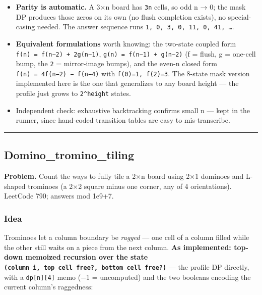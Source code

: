 \documentclass[
  10pt,
  letterpaper,
  onecolumn]{article}
\providecommand{\tightlist}{%
  \setlength{\itemsep}{0pt}\setlength{\parskip}{0pt}}
\begin{document}
\begin{itemize}
\tightlist
\item
  \textbf{Parity is automatic.} A 3×n board has \texttt{3n} cells, so
  odd n → 0; the mask DP produces those zeros on its own (no flush
  completion exists), no special-casing needed. The answer sequence runs
  \texttt{1,\ 0,\ 3,\ 0,\ 11,\ 0,\ 41,\ …}.
\item
  \textbf{Equivalent formulations} worth knowing: the two-state coupled
  form \texttt{f(n)\ =\ f(n−2)\ +\ 2g(n−1)},
  \texttt{g(n)\ =\ f(n−1)\ +\ g(n−2)} (f = flush, g = one-cell bump, the
  \texttt{2} = mirror-image bumps), and the even-n closed form
  \texttt{f(n)\ =\ 4f(n−2)\ −\ f(n−4)} with \texttt{f(0)=1,\ f(2)=3}.
  The 8-state mask version implemented here is the one that generalizes
  to any board height --- the profile just grows to \texttt{2\^{}height}
  states.
\item
  Independent check: exhaustive backtracking confirms small n --- kept
  in the runner, since hand-coded transition tables are easy to
  mis-transcribe.
\end{itemize}

\begin{center}\rule{0.5\linewidth}{0.5pt}\end{center}

\hypertarget{domino_tromino_tiling}{%
\subsection{Domino\_tromino\_tiling}\label{domino_tromino_tiling}}

\textbf{Problem.} Count the ways to fully tile a 2×n board using 2×1
dominoes and L-shaped trominoes (a 2×2 square minus one corner, any of 4
orientations). LeetCode 790; answers mod 1e9+7.

\hypertarget{idea-11}{%
\subsubsection{Idea}\label{idea-11}}

Trominoes let a column boundary be \emph{ragged} --- one cell of a
column filled while the other still waits on a piece from the next
column. \textbf{As implemented: top-down memoized recursion over the
state \texttt{(column\ i,\ top\ cell\ free?,\ bottom\ cell\ free?)}} ---
the profile DP directly, with a \texttt{dp{[}n{]}{[}4{]}} memo (−1 =
uncomputed) and the two booleans encoding the current column's
raggedness:
\end{document}
